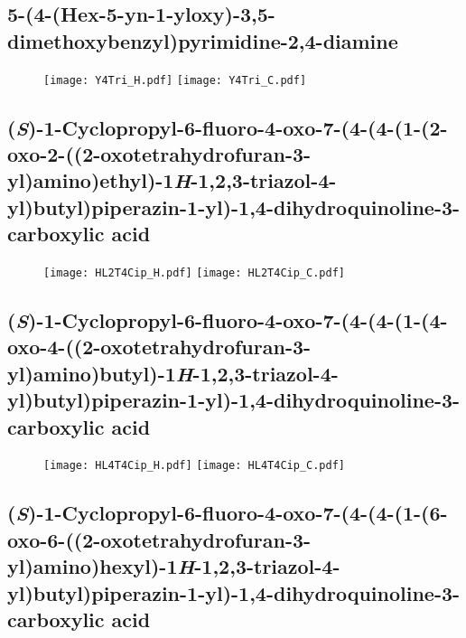 
\subsection{5-(4-(Hex-5-yn-1-yloxy)-3,5-dimethoxybenzyl)pyrimidine-2,4-diamine }

\begin{figure}[H]
	\centering
		\texttt{[image: Y4Tri\_H.pdf]}		\texttt{[image: Y4Tri\_C.pdf]}
\end{figure}

\subsection{(\textit{S})-1-Cyclopropyl-6-fluoro-4-oxo-7-(4-(4-(1-(2-oxo-2-((2-oxotetrahydrofuran-3-yl)amino)ethyl)-1\textit{H}-1,2,3-triazol-4-yl)butyl)piperazin-1-yl)-1,4-dihydroquinoline-3-carboxylic acid }

\begin{figure}[H]
	\centering
		\texttt{[image: HL2T4Cip\_H.pdf]}
		\texttt{[image: HL2T4Cip\_C.pdf]}
\end{figure}

\subsection{(\textit{S})-1-Cyclopropyl-6-fluoro-4-oxo-7-(4-(4-(1-(4-oxo-4-((2-oxotetrahydrofuran-3-yl)amino)butyl)-1\textit{H}-1,2,3-triazol-4-yl)butyl)piperazin-1-yl)-1,4-dihydroquinoline-3-carboxylic acid }

\begin{figure}[H]
	\centering
		\texttt{[image: HL4T4Cip\_H.pdf]}
		\texttt{[image: HL4T4Cip\_C.pdf]}
\end{figure}

\subsection{(\textit{S})-1-Cyclopropyl-6-fluoro-4-oxo-7-(4-(4-(1-(6-oxo-6-((2-oxotetrahydrofuran-3-yl)amino)hexyl)-1\textit{H}-1,2,3-triazol-4-yl)butyl)piperazin-1-yl)-1,4-dihydroquinoline-3-carboxylic acid }


